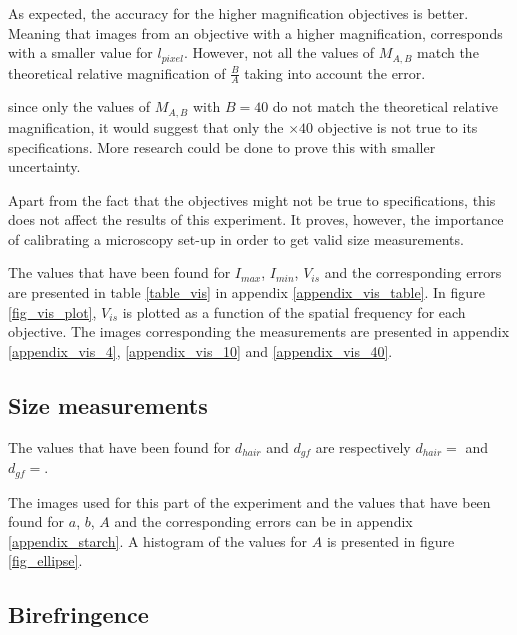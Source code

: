 As expected, the accuracy for the higher magnification objectives is better. Meaning that images from an objective with a higher magnification, corresponds with a smaller value for $l_{pixel}$. However, not all the values of $M_{A,B}$ match the theoretical relative magnification of $\frac{B}{A}$ taking into account the error.

since only the values of $M_{A,B}$ with $B = 40$ do not match the theoretical relative magnification, it would suggest that only the $\times 40$ objective is not true to its specifications. More research could be done to prove this with smaller uncertainty.

Apart from the fact that the objectives might not be true to specifications, this does not affect the results of this experiment. It proves, however, the importance of calibrating a microscopy set-up in order to get valid size measurements.

\bigskip


The values that have been found for $I_{max}$, $I_{min}$, $V_{is}$ and the corresponding errors are presented in table \ref{table_vis} in appendix \ref{appendix_vis_table}. In figure \ref{fig_vis_plot}, $V_{is}$ is plotted as a function of the spatial frequency for each objective. The images corresponding the measurements are presented in appendix \ref{appendix_vis_4}, \ref{appendix_vis_10} and \ref{appendix_vis_40}.



\subsection{Size measurements}

The values that have been found for $d_{hair}$ and $d_{gf}$ are respectively $d_{hair} =  $ and $d_{gf} =  $.


The images used for this part of the experiment and the values that have been found for $a$, $b$, $A$ and the corresponding errors can be  in appendix \ref{appendix_starch}. A histogram of the values for $A$ is presented in figure \ref{fig_ellipse}.



\subsection{Birefringence}

